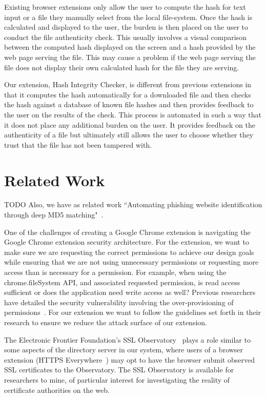 \documentclass[letterpaper,twocolumn,10pt]{article}
\begin{document}
Existing browser extensions only allow the user to compute the hash for text input or a file they manually select from the local file-system. Once the hash is calculated and displayed to the user, the burden is then placed on the user to conduct the file authenticity check. This usually involves a visual comparison between the computed hash displayed on the screen and a hash provided by the web page serving the file. This may cause a problem if the web page serving the file does not display their own calculated hash for the file they are serving.

Our extension, Hash Integrity Checker, is different from previous extensions in that it computes the hash automatically for a downloaded file and then checks the hash against a database of known file hashes and then provides feedback to the user on the results of the check. This process is automated in such a way that it does not place any additional burden on the user. It provides feedback on the authenticity of a file but ultimately still allows the user to choose whether they trust that the file has not been tampered with.

\section{Related Work}

TODO Also, we have as related work ``Automating phishing website identification through deep MD5 matching"~\cite{Wardman}.

One of the challenges of creating a Google Chrome extension is navigating the Google Chrome extension security architecture. For the extension, we want to make sure we are requesting the correct permissions to achieve our design goals while ensuring that we are not using unnecessary permissions or requesting more access than is necessary for a permission. For example, when using the chrome.fileSystem API, and associated requested permission, is read access sufficient or does the application need write access as well? Previous researchers have detailed the security vulnerability involving the over-provisioning of permissions~\cite{180206}. For our extension we want to follow the guidelines set forth in their research to ensure we reduce the attack surface of our extension.

The Electronic Frontier Foundation's SSL Observatory~\cite{ssl-observatory} plays a role
similar to some aspects of the directory server in our system, where users of a browser
extension (HTTPS Everywhere~\cite{https-everywhere}) may opt to have the browser
submit observed SSL certificates to the Observatory. The SSL Observatory is available for
researchers to mine, of particular interest for investigating the reality of certificate authorities
on the web.
\end{document}
